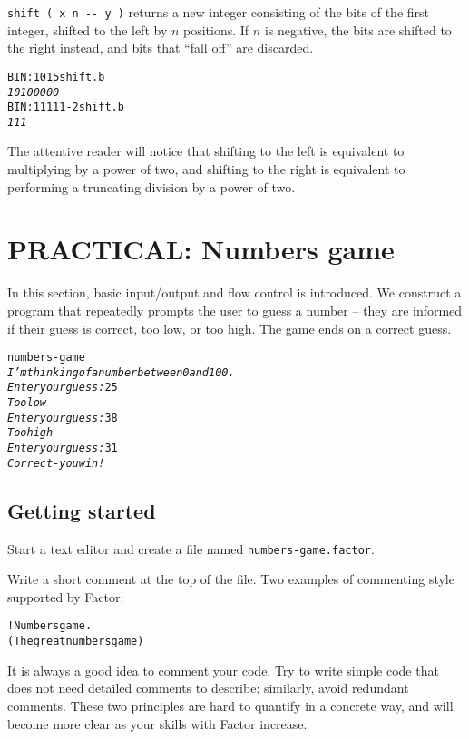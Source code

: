 \documentclass[english]{article}
\begin{document}
\texttt{shift ( x n -{}- y )} returns a new integer consisting of the bits of the first integer, shifted to the left by $n$ positions. If $n$ is negative, the bits are shifted to the right instead, and bits that ``fall off'' are discarded.

\begin{alltt}
BIN: 101 5 shift .b
\emph{10100000}
BIN: 11111 -2 shift .b
\emph{111}
\end{alltt}

The attentive reader will notice that shifting to the left is equivalent to multiplying by a power of two, and shifting to the right is equivalent to performing a truncating division by a power of two.

\section{PRACTICAL: Numbers game}

In this section, basic input/output and flow control is introduced.
We construct a program that repeatedly prompts the user to guess a
number -- they are informed if their guess is correct, too low, or
too high. The game ends on a correct guess.

\begin{alltt}
numbers-game
\emph{I'm thinking of a number between 0 and 100.}
\emph{Enter your guess:} 25
\emph{Too low}
\emph{Enter your guess:} 38
\emph{Too high}
\emph{Enter your guess:} 31
\emph{Correct - you win!}
\end{alltt}

\subsection{Getting started}

Start a text editor and create a file named \texttt{numbers-game.factor}.

Write a short comment at the top of the file. Two examples of commenting style supported by Factor:

\begin{alltt}
! Numbers game.
( The great numbers game )
\end{alltt}

It is always a good idea to comment your code. Try to write simple
code that does not need detailed comments to describe; similarly,
avoid redundant comments. These two principles are hard to quantify
in a concrete way, and will become more clear as your skills with
Factor increase.
\end{document}

